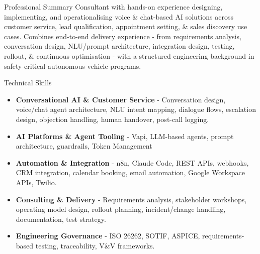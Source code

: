 \documentclass{resume} %
\begin{document}

	\begin{rSection}{Professional Summary}
		Consultant with hands-on experience designing, implementing, and operationalising voice \& chat-based AI solutions across customer service, lead qualification, appointment setting, \& sales discovery use cases. Combines end-to-end delivery experience - from requirements analysis, conversation design, NLU/prompt architecture, integration design, testing, rollout, \& continuous optimisation - with a structured engineering background in safety-critical autonomous vehicle programs.
	\end{rSection}


	\begin{rSection}{Technical Skills}
		\begin{itemize}
			\fontsize{10pt}{12pt}\selectfont
			\item \textbf{Conversational AI \& Customer Service} - Conversation design, voice/chat agent architecture, NLU intent mapping, dialogue flows, escalation design, objection handling, human handover, post-call logging.
			\item \textbf{AI Platforms \& Agent Tooling} - Vapi, LLM-based agents, prompt architecture, guardrails, Token Management
			\item \textbf{Automation \& Integration} - n8n, Claude Code, REST APIs, webhooks, CRM integration, calendar booking, email automation, Google Workspace APIs, Twilio.
			\item \textbf{Consulting \& Delivery} - Requirements analysis, stakeholder workshops, operating model design, rollout planning, incident/change handling, documentation, test strategy.
			\item \textbf{Engineering Governance} - ISO 26262, SOTIF, ASPICE, requirements-based testing, traceability, V\&V frameworks.
		\end{itemize}
	\end{rSection}

\end{document}

